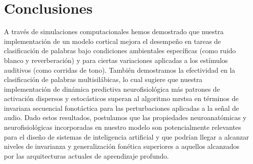 \section{Conclusiones}



A través de simulaciones computacionales hemos demostrado que nuestra implementación de un modelo cortical mejora el desempeño en tareas de clasificación de palabras bajo condiciones ambientales específicas (como ruido blanco y reverberación) y para ciertas variaciones aplicadas a los estímulos auditivos (como corridas de tono). También demostramos la efectividad en la clasificación de palabras multisilábicas, lo cual sugiere que nuestra implementación de dinámica predictiva neurofisiológica más patrones de activación dispersos y estocásticos superan al algoritmo \gls{mrstsa} en términos de invariaza secuencial fonotáctica para las perturbaciones aplicadas a la señal de audio. Dado estos resultados, postulamos que las propiedades neuroanatómicas y neurofisiológicas incorporadas en nuestro modelo son potencialmente relevantes para el diseño de sistemas de inteligencia artificial y que podrían llegar a alcanzar niveles de invarianza y generalización fonética superiores a aquellos alcanzados por las arquitecturas actuales de aprendizaje profundo. 

